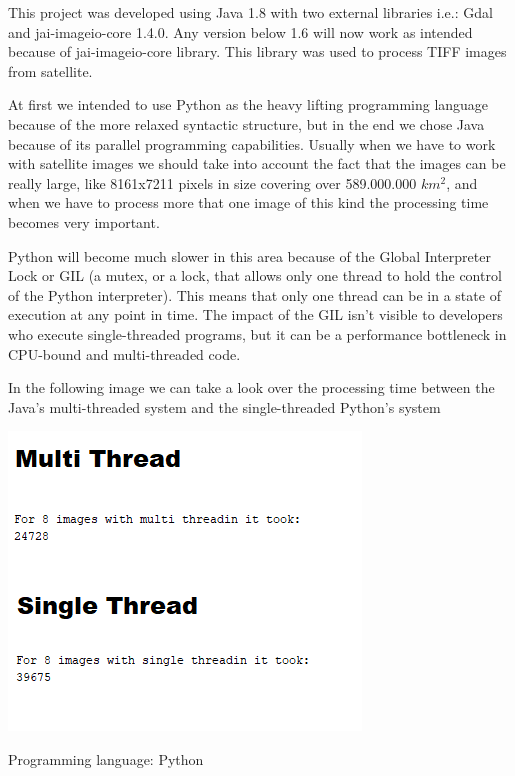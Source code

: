 \documentclass[12pt, a4paper]{report}
\begin{document}
This project was developed using Java 1.8 with two external libraries i.e.: Gdal and jai-imageio-core 1.4.0. Any version below 1.6 will now work as intended because of jai-imageio-core library. This library was used to process TIFF images from satellite.
\par

At first we intended to use Python as the heavy lifting programming language because of the more relaxed syntactic structure, but in the end we chose Java because of its parallel programming capabilities. Usually when we have to work with satellite images we should take into account the fact that the images can be really large, like 8161x7211 pixels in size covering over 589.000.000 $km^2$, and when we have to process more that one image of this kind the processing time becomes very important.
\par

Python will become much slower in this area because of the Global Interpreter Lock or GIL (a mutex, or a lock, that allows only one thread to hold the control of the Python interpreter). This means that only one thread can be in a state of execution at any point in time. The impact of the GIL isn’t visible to developers who execute single-threaded programs, but it can be a performance bottleneck in CPU-bound and multi-threaded code.
\par
\bigskip

In the following image we can take a look over the processing time between the Java's multi-threaded system and the single-threaded Python's system
\par

\includegraphics[scale=0.6]{multi_thread.png}
\par

{\Large Programming language: Python\par}
\medskip
\end{document}
